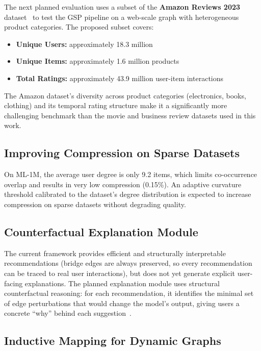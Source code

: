 The next planned evaluation uses a subset of the \textbf{Amazon Reviews 2023} dataset~\cite{amazon_reviews2023} to test the GSP pipeline on a web-scale graph with heterogeneous product categories. The proposed subset covers:
\begin{itemize}
    \item \textbf{Unique Users:} approximately 18.3 million
    \item \textbf{Unique Items:} approximately 1.6 million products
    \item \textbf{Total Ratings:} approximately 43.9 million user-item interactions
\end{itemize}

The Amazon dataset's diversity across product categories (electronics, books, clothing) and its temporal rating structure make it a significantly more challenging benchmark than the movie and business review datasets used in this work.

\subsection*{Improving Compression on Sparse Datasets}

On ML-1M, the average user degree is only 9.2 items, which limits co-occurrence overlap and results in very low compression (0.15\%). An adaptive curvature threshold calibrated to the dataset's degree distribution is expected to increase compression on sparse datasets without degrading quality.

\subsection*{Counterfactual Explanation Module}

The current framework provides efficient and structurally interpretable recommendations (bridge edges are always preserved, so every recommendation can be traced to real user interactions), but does not yet generate explicit user-facing explanations. The planned explanation module uses structural counterfactual reasoning: for each recommendation, it identifies the minimal set of edge perturbations that would change the model's output, giving users a concrete ``why'' behind each suggestion~\cite{PradoRomeroetal2023}.

\subsection*{Inductive Mapping for Dynamic Graphs}

